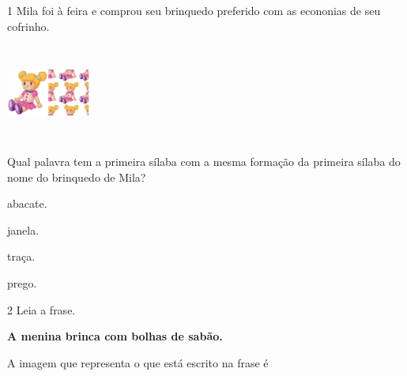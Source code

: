 
\num{1} Mila foi à feira e comprou seu brinquedo preferido com as
econonias de seu cofrinho.

\includegraphics[width=1.08889in,height=1.24236in]{media/image77.jpeg}


Qual palavra tem a primeira sílaba com a mesma formação da primeira
sílaba do nome do brinquedo de Mila?

\begin{escolha}
\item abacate.

\item janela.

\item traça.

\item prego.
\end{escolha}

\num{2} Leia a frase.

\textbf{A menina brinca com bolhas de sabão.}

A imagem que representa o que está escrito na frase é

